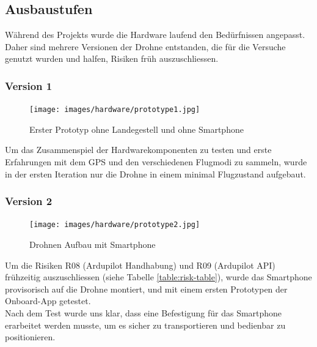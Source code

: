 \subsection{Ausbaustufen}

Während des Projekts wurde die Hardware laufend den Bedürfnissen angepasst. Daher sind mehrere Versionen der Drohne entstanden, die für die Versuche genutzt wurden und halfen, Risiken früh auszuschliessen.

\subsubsection{Version 1}

\begin{figure}[H]
	\centering
	\texttt{[image: images/hardware/prototype1.jpg]}
	\caption{Erster Prototyp ohne Landegestell und ohne Smartphone}
	\label{fig:prototyp-1}
\end{figure}

Um das Zusammenspiel der Hardwarekomponenten zu testen und erste Erfahrungen mit dem GPS und den verschiedenen Flugmodi zu sammeln, wurde in der ersten Iteration nur die Drohne in einem minimal Flugzustand aufgebaut.

\subsubsection{Version 2}

\begin{figure}[H]
	\centering
	\texttt{[image: images/hardware/prototype2.jpg]}
	\caption{Drohnen Aufbau mit Smartphone}
	\label{fig:prototyp-2}
\end{figure}

Um die Risiken R08 (Ardupilot Handhabung) und R09 (Ardupilot API) frühzeitig auszuschliessen (siehe Tabelle \ref{table:risk-table}), wurde das Smartphone provisorisch auf die Drohne montiert, und mit einem ersten Prototypen der Onboard-App getestet. \\
Nach dem Test wurde uns klar, dass eine Befestigung für das Smartphone erarbeitet werden musste, um es sicher zu transportieren und bedienbar zu positionieren.
